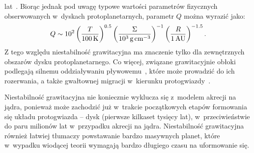 lat~\cite{HB11, GHB12}. Biorąc jednak pod uwagę typowe wartości parametrów
fizycznych obserwowanych w~dyskach protoplanetarnych, parametr $Q$ można
wyrazić jako:
%
\begin{equation}
   Q \sim 10^2 
   \left(\frac{T}{100\hbox{$\thinspace\textrm{K}$}}\right)^{0.5}
   \left(\frac{\Sigma}{10^3\hbox{$\thinspace\textrm{g}$}\hbox{$\thinspace\textrm{cm}$}^{-3}}\right)^{-1}
   \left(\frac{R}{1\hbox{$\thinspace\textrm{AU}$}}\right)^{-1.5}.
   \label{eq:Qemp}
\end{equation}
%
Z tego względu niestabilność grawitacyjna ma znaczenie tylko dla zewnętrznych
obszarów dysku protoplanetarnego. Co więcej, związane grawitacyjnie obłoki
podlegają silnemu oddziaływaniu pływowemu~\cite{VH12}, które może prowadzić do
ich rozerwania, a także gwałtownej migracji w~kierunku protogwiazdy~\cite{BMP11}.
\par Niestabilność grawitacyjna nie koniecznie wyklucza się z~modelem akrecji na
jądra, ponieważ może zachodzić już w~trakcie początkowych etapów formowania się
 układu protogwiazda -- dysk (pierwsze kilkaset tysięcy lat), w~przeciwieństwie do
 paru milionów lat w~przypadku akrecji na jądra. Niestabilność grawitacyjna
 również łatwiej tłumaczy powstawanie bardzo masywnych planet, które w~wypadku
 wiodącej teorii wymagają bardzo długiego czasu na uformowanie się.


